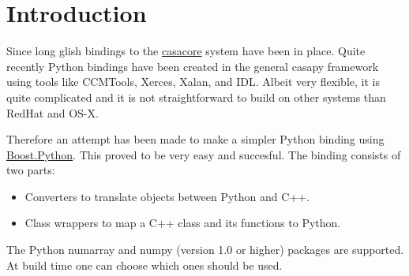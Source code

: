 \section{Introduction}
Since long glish bindings to the \href{http://casacore.googlecode.com}{casacore} system have been in
place. Quite recently Python bindings have been created in the general
casapy framework using tools like CCMTools, Xerces, Xalan, and
IDL. Albeit very flexible, it is quite complicated and it is not
straightforward to build on other systems than RedHat and OS-X.

Therefore an attempt has been made to make a simpler Python binding
using \href{http://www.boost.org/libs/python/doc}{Boost.Python}.
This proved to be very easy and succesful.
The binding consists of two parts:
\begin{itemize}
\item Converters to translate objects between Python and C++.
\item Class wrappers to map a C++ class and its functions to Python.
\end{itemize}
The Python numarray and numpy (version 1.0 or higher) packages are
supported. At build time one can choose which ones should be used.

